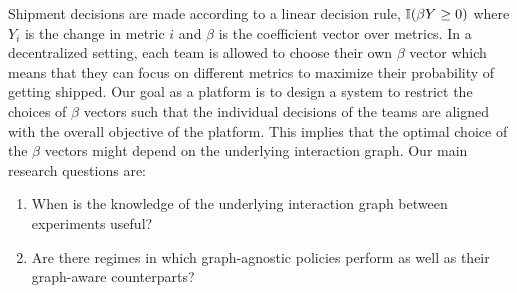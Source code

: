 \documentclass[11pt,a4paper]{article}
\begin{document}
Shipment decisions are made according to a linear decision rule, $\mathbb{I}(\beta Y \geq 0)$ where $Y_i$ is the change in metric $i$ and $\beta$ is the coefficient vector over metrics. In a decentralized setting, each team is allowed to choose their own $\beta$ vector which means that they can focus on different metrics to maximize their probability of getting shipped. Our goal as a platform is to design a system to restrict the choices of $\beta$ vectors such that the individual decisions of the teams are aligned with the overall objective of the platform. This implies that the optimal choice of the $\beta$ vectors might depend on the underlying interaction graph. Our main research questions are:
\begin{enumerate}
\item When is the knowledge of the underlying interaction graph between experiments useful? 
\item Are there regimes in which graph-agnostic policies perform as well as their graph-aware counterparts? 
\end{enumerate}
\end{document}
